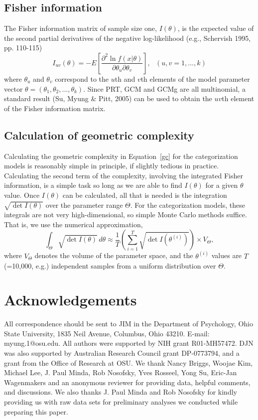 \documentclass[11pt]{article}
\begin{document}
\subsection*{Fisher information}
The Fisher information matrix of sample size one, $I(\theta)$, is the expected value of the second
partial derivatives of the negative log-likelihood (e.g., Schervish 1995, pp. 110-115)
\begin{displaymath}
I_{uv}(\theta) = - E \left[ \frac{\partial^2 \ln f(x|\theta)}{\partial \theta_u \partial \theta_v}
\right],~~~(u,v=1,...,k) \nonumber
\end{displaymath}
where $\theta_u$ and $\theta_v$ correspond to the $u$th and $v$th elements of the model parameter
vector $\theta=(\theta_1,\theta_2,...,\theta_k)$. Since PRT, GCM and GCMg are all multinomial, a
standard result (Su, Myung \& Pitt, 2005) can be used to obtain the $uv$th element of the Fisher
information matrix.


\subsection*{Calculation of geometric complexity}
Calculating the geometric complexity in Equation~\ref{gc} for the categorization models is
reasonably simple in principle, if slightly tedious in practice. Calculating the second term of
the complexity, involving the integrated Fisher information, is a simple task so long as we are
able to find $I(\theta)$ for a given $\theta$ value. Once $I(\theta)$ can be calculated, all that
is needed is the integration $\sqrt{\det I(\theta)}$ over the parameter range $\Theta$. For the
categorization models, these integrals are not very high-dimensional, so simple Monte Carlo
methods suffice. That is, we use the numerical approximation,
\begin{displaymath}
\int_{\Theta} \sqrt{\det I(\theta)} \, d\theta \approx \frac {1}{T} \left( \sum_{i=1}^{T}
\sqrt{\det I\left(\theta^{(i)}\right)} \right) \times V_{\Theta},
\end{displaymath}
\noindent where $V_{\Theta}$ denotes the volume of the parameter space, and the $\theta^{(i)}$
values are $T$ (=10,000, e.g.) independent samples from a uniform distribution over $\Theta$.


\newpage
\section*{Acknowledgements}
All correspondence should be sent to JIM in the Department of Psychology, Ohio State University,
1835 Neil Avenue, Columbus, Ohio 43210. E-mail: myung.1@osu.edu.  All authors were supported by
NIH grant R01-MH57472. DJN was also supported by Australian Research Council grant DP-0773794, and
a grant from the Office of Research at OSU. We thank Nancy Briggs, Woojae Kim, Michael Lee, J.
Paul Minda, Rob Nosofsky, Yves Rosseel, Yong Su, Eric-Jan Wagenmakers and an anonymous reviewer
for providing data, helpful comments, and discussions. We also thanks J. Paul Minda and Rob
Nosofsky for kindly providing us with raw data sets for preliminary analyses we conducted while
preparing this paper.
\end{document}
